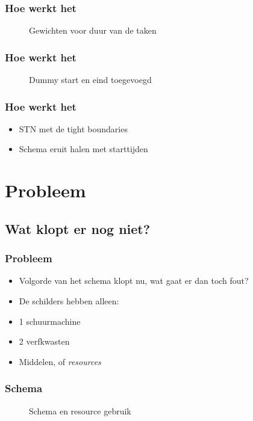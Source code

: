 \documentclass{beamer}
\theoremstyle{definition}
\newcommand{\inputtikz}[1]{}
\begin{document}
\begin{frame}
    	\frametitle{Hoe werkt het}
	
	\begin{figure}[ht]
		\inputtikz{stn}
		\vspace{-1em}
		\caption{Gewichten voor duur van de taken}
	\end{figure}
\end{frame}

\begin{frame}
    	\frametitle{Hoe werkt het}
	
	\begin{figure}[ht]
		\makebox[\textwidth][c]{\resizebox{1\paperwidth}{!}{
			\inputtikz{stn_dummy}
		}}
		\vspace{-1em}
		\caption{Dummy start en eind toegevoegd}
	\end{figure}
\end{frame}

\begin{frame}
    	\frametitle{Hoe werkt het}
	\begin{itemize}
		\item STN met de tight boundaries
		\item Schema eruit halen met starttijden
	\end{itemize}
\end{frame}

\section{Probleem}
\subsection{Wat klopt er nog niet?}
\begin{frame}
	\frametitle{Probleem}
	\begin{itemize}
		\item Volgorde van het schema klopt nu, wat gaat er dan toch fout?
		\item<2->  De schilders hebben alleen:
		\item<2-> 1 schuurmachine
		\item<2-> 2 verfkwasten
		\item<3-> Middelen, of \emph{resources}
	\end{itemize}
\end{frame}

\begin{frame}
\frametitle{Schema}
	\vspace{-1.2em}
	\begin{figure}[ht]
		\makebox[\textwidth][c]{\resizebox{.36\paperwidth}{!}{
			\inputtikz{schedule_infeasible_colored_profile}
		}}
		\vspace{-1.3em}
		\caption{Schema en resource gebruik}
	\end{figure}
\end{frame}
\end{document}
